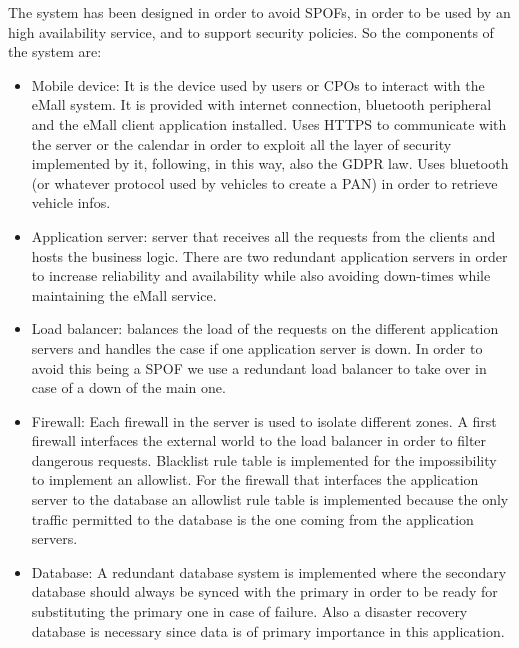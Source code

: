 The system has been designed in order to avoid \acp{SPOF}, in order to be used by an high availability service, and to support security policies. So the components of the system are:
\begin{itemize}
    \item Mobile device: It is the device used by users or \acp{CPO} to interact with the \ac{eMall} system. It is provided with internet connection, bluetooth peripheral and the \ac{eMall} client application installed. Uses \ac{HTTPS} to communicate with the server or the calendar in order to exploit all the layer of security implemented by it, following, in this way, also the \ac{GDPR} law. Uses bluetooth (or whatever protocol used by vehicles to create a PAN) in order to retrieve vehicle infos.
    \item Application server: server that receives all the requests from the clients and hosts the business logic. There are two redundant application servers in order to increase reliability and availability while also avoiding down-times while maintaining the \ac{eMall} service.
    \item Load balancer: balances the load of the requests on the different application servers and handles the case if one application server is down. In order to avoid this being a \ac{SPOF} we use a redundant load balancer to take over in case of a down of the main one.
    \item Firewall: Each firewall in the server is used to isolate different zones. A first firewall interfaces the external world to the load balancer in order to filter dangerous requests.
          Blacklist rule table is implemented for the impossibility to implement an allowlist. For the firewall that interfaces the application server to the database an allowlist rule table is implemented because the only traffic permitted to the database is the one coming from the application servers. 
    \item Database: A redundant database system is implemented where the secondary database should always be synced with the primary in order to be ready for substituting the primary one in case of failure. Also a disaster recovery database is necessary since data is of primary importance in this application.
\end{itemize}


